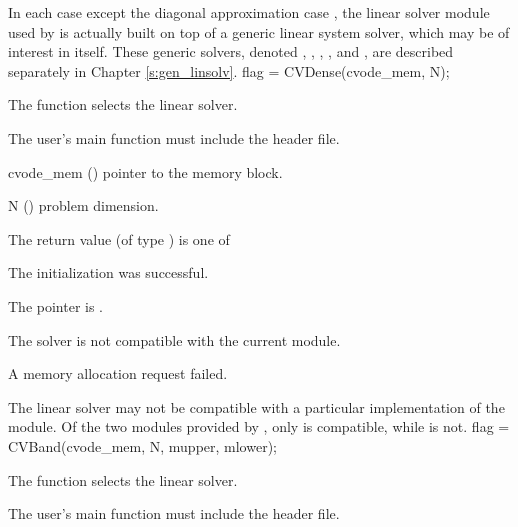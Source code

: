 In each case except the diagonal approximation case {\cvdiag}, the linear
solver module used by {\cvode} is actually built on top of a generic
linear system solver, which may be of interest in itself.  These generic
solvers, denoted {\dense}, {\band}, {\spgmr}, {\spbcg}, and {\sptfqmr},
are described separately in Chapter \ref{s:gen_linsolv}.
{
  flag = CVDense(cvode\_mem, N);
}
{
  The function  selects the {\cvdense} linear solver. 

  The user's main function must include the  header file.
}
{
  \begin{args}
  \item[cvode\_mem] ()
    pointer to the {\cvode} memory block.
  \item[N] ()
    problem dimension.
  \end{args}
}
{
  The return value  (of type ) is one of
  \begin{args}
  \item[\Id{CVDENSE\_SUCCESS}] 
    The {\cvdense} initialization was successful.
  \item[\Id{CVDENSE\_MEM\_NULL}]
    The  pointer is .
  \item[\Id{CVDENSE\_ILL\_INPUT}]
    The {\cvdense} solver is not compatible with the current {\nvector} module.
  \item[\Id{CVDENSE\_MEM\_FAIL}]
    A memory allocation request failed.
  \end{args}
}
{
  The {\cvdense} linear solver may not be compatible with a particular
  implementation of the {\nvector} module. 
  Of the two {\nvector} modules provided by {\sundials}, only {\nvecs} is 
  compatible, while {\nvecp} is not.
}
{
  flag = CVBand(cvode\_mem, N, mupper, mlower);
}
{
  The function  selects the {\cvband} linear solver. 

  The user's main function must include the  header file.
}
